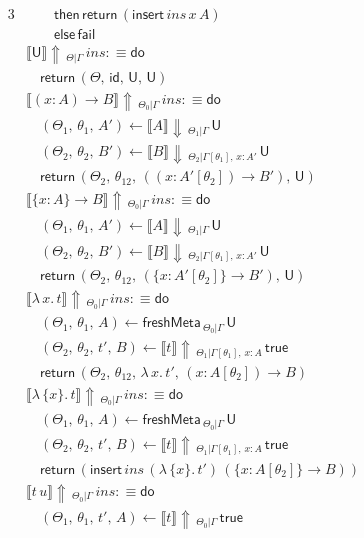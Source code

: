 \documentclass[acmsmall,review,anonymous,prologue,dvipsnames]{acmart}\settopmatter{printfolios=true,printccs=false,printacmref=false}
\renewcommand{\U}{\mathsf{U}}
\newcommand{\id}{\mathsf{id}}
\newcommand{\freshMeta}[3]{\mathsf{freshMeta}\,_{#1|#2}\,#3}
\newcommand{\fail}{\mathsf{fail}}
\newcommand{\echeck}[4]{\llbracket#1\rrbracket\!\Downarrow\,_{#2|#3}\,#4}
\newcommand{\einfer}[4]{\llbracket#1\rrbracket\!\Uparrow\,_{#3|#4}\,#2}
\newcommand{\edo}{\boldsymbol{\mathsf{do}}}
\newcommand{\ereturn}{\boldsymbol{\mathsf{return}}}
\newcommand{\ethen}{\boldsymbol{\mathsf{then}}}
\newcommand{\eelse}{\boldsymbol{\mathsf{else}}}
\newcommand{\true}{\mathsf{true}}
\newcommand{\einsert}[3]{\mathsf{insert}\,#1\,#2\,#3}
\theoremstyle{remark}
\begin{document}
\begin{alignat*}{3}
  &\qquad   \ethen\, \ereturn\,(\einsert{ins}{x}{A})\\
  &\qquad   \eelse\, \fail\\
  &\einfer{\U}{ins}{\Theta}{\Gamma} :\equiv \edo\\
  &\quad\ereturn\,(\Theta,\,\id,\,\U,\,\U)\\
  &\einfer{(x : A)\to B}{ins}{\Theta_0}{\Gamma} :\equiv \edo\\
  &\quad(\Theta_1,\,\theta_1,\,A') \leftarrow \echeck{A}{\Theta_1}{\Gamma}{\U}\\
  &\quad(\Theta_2,\,\theta_2,\,B') \leftarrow
                 \echeck{B}{\Theta_2}{\Gamma[\theta_1],\,x : A'}{\U}\\
  &\quad\ereturn\,(\Theta_2,\,\theta_{12},
                 \,((x : A'[\theta_2])\to B'),\,\U)\\
  &\einfer{\{x : A\}\to B}{ins}{\Theta_0}{\Gamma} :\equiv \edo\\
  &\quad(\Theta_1,\,\theta_1,\,A') \leftarrow \echeck{A}{\Theta_1}{\Gamma}{\U}\\
  &\quad(\Theta_2,\,\theta_2,\,B') \leftarrow
                 \echeck{B}{\Theta_2}{\Gamma[\theta_1],\,x : A'}{\U}\\
  &\quad\ereturn\,(\Theta_2,\,\theta_{12},
                 \,(\{x : A'[\theta_2]\}\to B'),\,\U)\\
  &\einfer{\lambda\,x.\,t}{ins}{\Theta_0}{\Gamma} :\equiv \edo \\
  &\quad(\Theta_1,\,\theta_1,\,A)\leftarrow \freshMeta{\Theta_0}{\Gamma}{\U}\\
  &\quad(\Theta_2,\,\theta_2,\,t',\,B)\leftarrow \einfer{t}{\true}{\Theta_1}{\Gamma[\theta_1],\,x:A}\\
  &\quad\ereturn\,(\Theta_2,\,\theta_{12},\,\lambda\,x.\,t',\,(x : A[\theta_2])\to B)\\
  &\einfer{\lambda\,\{x\}.\,t}{ins}{\Theta_0}{\Gamma} :\equiv \edo \\
  &\quad(\Theta_1,\,\theta_1,\,A)\leftarrow \freshMeta{\Theta_0}{\Gamma}{\U}\\
  &\quad(\Theta_2,\,\theta_2,\,t',\,B)\leftarrow \einfer{t}{\true}{\Theta_1}{\Gamma[\theta_1],\,x:A}\\
  &\quad\ereturn\,(\einsert{ins}{(\lambda\,\{x\}.\,t')}{(\{x : A[\theta_2]\}\to B)})\\
  &\einfer{t\,u}{ins}{\Theta_0}{\Gamma} :\equiv \edo \\
  &\quad (\Theta_1,\,\theta_1,\,t',\,A) \leftarrow \einfer{t}{\true}{\Theta_0}{\Gamma}\\

\end{alignat*}
\end{document}
